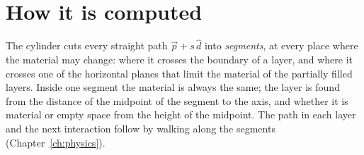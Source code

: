 \section{How it is computed}
\label{sec:sphere-algorithm}

The cylinder cuts every straight path $\vec p + s\,\hat d$ into \emph{segments}, at every place where the material may change: where it
crosses the boundary of a layer, and where it crosses one of the horizontal planes that limit the material of the partially filled
layers. Inside one segment the material is always the same; the layer is found from the distance of the midpoint of the segment to the
axis, and whether it is material or empty space from the height of the midpoint. The path in each layer and the next interaction
follow by walking along the segments (Chapter~\ref{ch:physics}).

